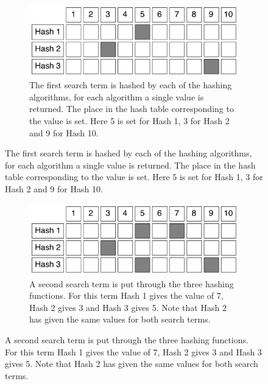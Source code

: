 \documentclass{article}
\begin{document}
\begin{figure}[hbt]
  \ContinuedFloat  
  \label{bloom-2}
  \centering
  \begin{subfigure}{\textwidth}
  \makeatletter
  \includegraphics[width=\textwidth]{images/bloom-2}
  \caption{The first search term is hashed by each of the hashing algorithms, for each algorithm a single value is returned. The place in the hash table corresponding to the value is set. Here 5 is set for Hash 1, 3 for Hash 2 and 9 for Hash 10.}
  \end{subfigure}
\end{figure}

\begin{figure}[hbt]
  \ContinuedFloat  
  \label{bloom-3}
  \centering
  \begin{subfigure}{\textwidth}
  \makeatletter
  \includegraphics[width=\textwidth]{images/bloom-3}
  \caption{A second search term is put through the three hashing functions. For this term Hash 1 gives the value of 7, Hash 2 gives 3 and Hash 3 gives 5. Note that Hash 2 has given the same values for both search terms.}
  \end{subfigure}
\end{figure}
\end{document}
